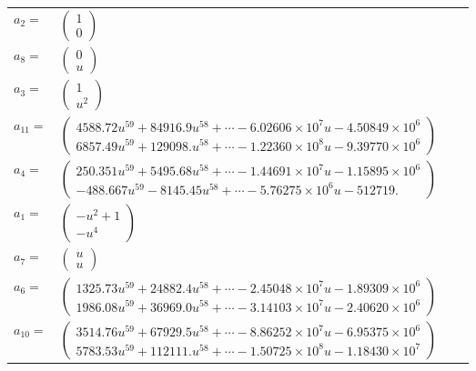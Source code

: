 \documentclass[1p]{elsarticle_modified}
\theoremstyle{definition}
\begin{document}
\begin{tabular}{m{7pt} m{180pt} m{7pt} m{180pt} }
\flushright $a_{2}=$&$\begin{pmatrix}1\\0\end{pmatrix}$ \\
\flushright $a_{8}=$&$\begin{pmatrix}0\\u\end{pmatrix}$ \\
\flushright $a_{3}=$&$\begin{pmatrix}1\\u^2\end{pmatrix}$ \\
\flushright $a_{11}=$&$\begin{pmatrix}4588.72 u^{59}+84916.9 u^{58}+\cdots-6.02606\times10^{7} u-4.50849\times10^{6}\\6857.49 u^{59}+129098. u^{58}+\cdots-1.22360\times10^{8} u-9.39770\times10^{6}\end{pmatrix}$ \\
\flushright $a_{4}=$&$\begin{pmatrix}250.351 u^{59}+5495.68 u^{58}+\cdots-1.44691\times10^{7} u-1.15895\times10^{6}\\-488.667 u^{59}-8145.45 u^{58}+\cdots-5.76275\times10^{6} u-512719.\end{pmatrix}$ \\
\flushright $a_{1}=$&$\begin{pmatrix}- u^2+1\\- u^4\end{pmatrix}$ \\
\flushright $a_{7}=$&$\begin{pmatrix}u\\u\end{pmatrix}$ \\
\flushright $a_{6}=$&$\begin{pmatrix}1325.73 u^{59}+24882.4 u^{58}+\cdots-2.45048\times10^{7} u-1.89309\times10^{6}\\1986.08 u^{59}+36969.0 u^{58}+\cdots-3.14103\times10^{7} u-2.40620\times10^{6}\end{pmatrix}$ \\
\flushright $a_{10}=$&$\begin{pmatrix}3514.76 u^{59}+67929.5 u^{58}+\cdots-8.86252\times10^{7} u-6.95375\times10^{6}\\5783.53 u^{59}+112111. u^{58}+\cdots-1.50725\times10^{8} u-1.18430\times10^{7}\end{pmatrix}$ \\

\end{tabular}
\end{document}
